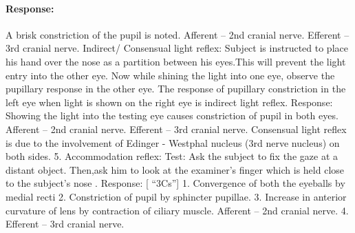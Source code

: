 \documentclass[a4paper,12pt]{book}
\begin{document}
			\paragraph{Response:} A brisk constriction of the pupil is noted. Afferent – 2nd cranial nerve.
			Efferent – 3rd cranial nerve.
			Indirect/ Consensual light reflex: Subject is instructed to place his hand over the nose as a partition between his eyes.This will prevent the light entry into the other eye. Now while shining the light into one eye, observe the pupillary response in the other eye. The response of pupillary constriction in the left eye when light is shown on the right eye is indirect light reflex.
			Response:
			Showing the light into the testing eye causes constriction of pupil in both eyes. Afferent 	– 	2nd cranial nerve.
			Efferent 	– 	3rd cranial nerve. 
			Consensual light reflex is due to the involvement of Edinger - Westphal nucleus           (3rd nerve nucleus) on both sides.
			5. Accommodation reflex:
			Test: Ask the subject to fix the gaze at a distant object. Then,ask him to look at the examiner’s finger which is held close to the subject’s nose .
			Response: [ “3Cs”]
			1. Convergence of both the eyeballs by medial recti
			2. Constriction of pupil by sphincter pupillae.
			3. Increase in anterior curvature of lens by contraction of ciliary muscle. Afferent – 2nd cranial nerve.
			4. Efferent – 3rd cranial nerve.


	
\end{document}
